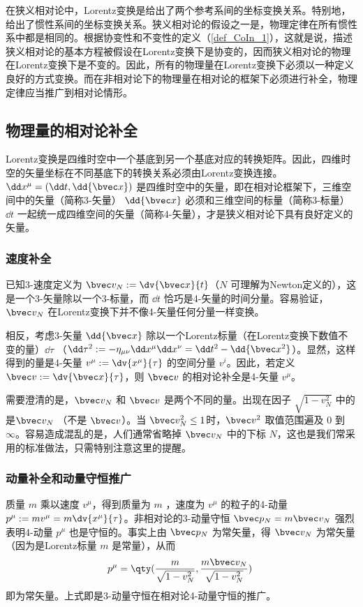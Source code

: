 
\cite{AZee}在狭义相对论中，Lorentz变换是给出了两个参考系间的坐标变换关系。特别地，给出了惯性系间的坐标变换关系。狭义相对论的假设之一是，物理定律在所有惯性系中都是相同的。根据协变性和不变性的定义（\autoref{def_CoIn_1}），这就是说，描述狭义相对论的基本方程被假设在Lorentz变换下是协变的，因而狭义相对论的物理在Lorentz变换下是不变的。因此，所有的物理量在Lorentz变换下必须以一种定义良好的方式变换。而在非相对论下的物理量在相对论的框架下必须进行补全，物理定律应当推广到相对论情形。
\subsection{物理量的相对论补全}
Lorentz变换是四维时空中一个基底到另一个基底对应的转换矩阵。因此，四维时空的矢量坐标在不同基底下的转换关系必须由Lorentz变换连接。$\dd x^\mu=(\dd t,\dd{\bvec x})$ 是四维时空中的矢量，即在相对论框架下，三维空间中的矢量（简称3-矢量） $\dd{\bvec x}$ 必须和三维空间的标量（简称3-标量） $\dd t$ 一起统一成四维空间的矢量（简称4-矢量），才是狭义相对论下具有良好定义的矢量。

\subsubsection{速度补全}
已知3-速度定义为 $\bvec v_N:=\dv{\bvec x}{t}$（$N$ 可理解为Newton定义的），这是一个3-矢量除以一个3-标量，而 $\dd t$ 恰巧是4-矢量的时间分量。容易验证，$\bvec v_N$ 在Lorentz变换下并不像4-矢量任何分量一样变换。

相反，考虑3-矢量 $\dd{\bvec x}$ 除以一个Lorentz标量（在Lorentz变换下数值不变的量）$\dd\tau$ （$\dd \tau^2:=-\eta_{\mu\nu}\dd x^{\mu}\dd x^\nu=\dd t^2-\dd {\bvec x^2}$）。显然，这样得到的量是4-矢量 $v^\mu:=\dv{x^\mu}{\tau}$ 的空间分量 $v^i$。因此，若定义 $\bvec v:=\dv{\bvec x}{\tau}$，则 $\bvec v$ 的相对论补全是4-矢量 $v^\mu$。

需要澄清的是，$\bvec v_N$ 和 $\bvec v$ 是两个不同的量。出现在因子 $\sqrt{1-v_N^2}$ 中的是$\bvec v_N$ （不是 $\bvec v$）。当 $\bvec v_N^2\leq1$时，$\bvec v^2$ 取值范围遍及 $0$ 到 $\infty$。容易造成混乱的是，人们通常省略掉 $\bvec v_N$ 中的下标 $N$，这也是我们常采用的标准做法，只需特别注意这里的提醒。

\subsubsection{动量补全和动量守恒推广}
质量 $m$ 乘以速度 $v^\mu$，得到质量为 $m$ ，速度为 $v^\mu$ 的粒子的4-动量 $p^\mu:=mv^\mu=m\dv{x^\mu}{\tau}$。非相对论的3-动量守恒 $\bvec p_N=m\bvec v_N$ 强烈表明4-动量 $p^\mu$ 也是守恒的。事实上由 $\bvec p_N$ 为常矢量，得 $\bvec v_N$ 为常矢量（因为是Lorentz标量 $m$ 是常量），从而 
\begin{equation}
p^\mu=\qty(\frac{m}{\sqrt{1-v_N^2}},\frac{m\bvec v_N}{\sqrt{1-v_N^2}})~
\end{equation}
即为常矢量。上式即是3-动量守恒在相对论4-动量守恒的推广。

